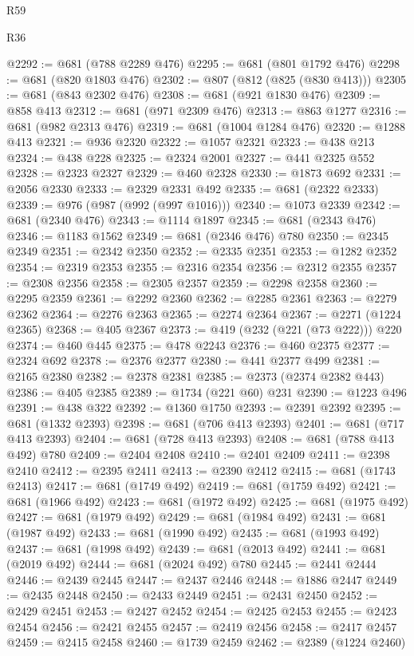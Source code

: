 \begin{lexlean}{R59}
\begin{lexlean}{R36}
\begin{coremodule}
{{{{{{{{{{{{{{{{{{{{{{{{{{{{{{{{{{{{{{{{{{{{{{{{{{{{{{{{{{{{{{{{{{{{{{{{{{{{{{{{{{@2292 := @681 (@788 @2289 @476)
@2295 := @681 (@801 @1792 @476)
@2298 := @681 (@820 @1803 @476)
@2302 := @807 (@812 (@825 (@830 @413)))
@2305 := @681 (@843 @2302 @476)
@2308 := @681 (@921 @1830 @476)
@2309 := @858 @413
@2312 := @681 (@971 @2309 @476)
@2313 := @863 @1277
@2316 := @681 (@982 @2313 @476)
@2319 := @681 (@1004 @1284 @476)
@2320 := @1288 @413
@2321 := @936 @2320
@2322 := @1057 @2321
@2323 := @438 @213
@2324 := @438 @228
@2325 := @2324 @2001
@2327 := @441 @2325 @552
@2328 := @2323 @2327
@2329 := @460 @2328
@2330 := @1873 @692
@2331 := @2056 @2330
@2333 := @2329 @2331 @492
@2335 := @681 (@2322 @2333)
@2339 := @976 (@987 (@992 (@997 @1016)))
@2340 := @1073 @2339
@2342 := @681 (@2340 @476)
@2343 := @1114 @1897
@2345 := @681 (@2343 @476)
@2346 := @1183 @1562
@2349 := @681 (@2346 @476) @780
@2350 := @2345 @2349
@2351 := @2342 @2350
@2352 := @2335 @2351
@2353 := @1282 @2352
@2354 := @2319 @2353
@2355 := @2316 @2354
@2356 := @2312 @2355
@2357 := @2308 @2356
@2358 := @2305 @2357
@2359 := @2298 @2358
@2360 := @2295 @2359
@2361 := @2292 @2360
@2362 := @2285 @2361
@2363 := @2279 @2362
@2364 := @2276 @2363
@2365 := @2274 @2364
@2367 := @2271 (@1224 @2365)
@2368 := @405 @2367
@2373 := @419 (@232 (@221 (@73 @222))) @220
@2374 := @460 @445
@2375 := @478 @2243
@2376 := @460 @2375
@2377 := @2324 @692
@2378 := @2376 @2377
@2380 := @441 @2377 @499
@2381 := @2165 @2380
@2382 := @2378 @2381
@2385 := @2373 (@2374 @2382 @443)
@2386 := @405 @2385
@2389 := @1734 (@221 @60) @231
@2390 := @1223 @496
@2391 := @438 @322
@2392 := @1360 @1750
@2393 := @2391 @2392
@2395 := @681 (@1332 @2393)
@2398 := @681 (@706 @413 @2393)
@2401 := @681 (@717 @413 @2393)
@2404 := @681 (@728 @413 @2393)
@2408 := @681 (@788 @413 @492) @780
@2409 := @2404 @2408
@2410 := @2401 @2409
@2411 := @2398 @2410
@2412 := @2395 @2411
@2413 := @2390 @2412
@2415 := @681 (@1743 @2413)
@2417 := @681 (@1749 @492)
@2419 := @681 (@1759 @492)
@2421 := @681 (@1966 @492)
@2423 := @681 (@1972 @492)
@2425 := @681 (@1975 @492)
@2427 := @681 (@1979 @492)
@2429 := @681 (@1984 @492)
@2431 := @681 (@1987 @492)
@2433 := @681 (@1990 @492)
@2435 := @681 (@1993 @492)
@2437 := @681 (@1998 @492)
@2439 := @681 (@2013 @492)
@2441 := @681 (@2019 @492)
@2444 := @681 (@2024 @492) @780
@2445 := @2441 @2444
@2446 := @2439 @2445
@2447 := @2437 @2446
@2448 := @1886 @2447
@2449 := @2435 @2448
@2450 := @2433 @2449
@2451 := @2431 @2450
@2452 := @2429 @2451
@2453 := @2427 @2452
@2454 := @2425 @2453
@2455 := @2423 @2454
@2456 := @2421 @2455
@2457 := @2419 @2456
@2458 := @2417 @2457
@2459 := @2415 @2458
@2460 := @1739 @2459
@2462 := @2389 (@1224 @2460)
}}}}}}}}}}}}}}}}}}}}}}}}}}}}}}}}}}}}}}}}}}}}}}}}}}}}}}}}}}}}}}}}}}}}}}}}}}}}}}}}}}
\end{coremodule}
\end{lexlean}
\end{lexlean}
